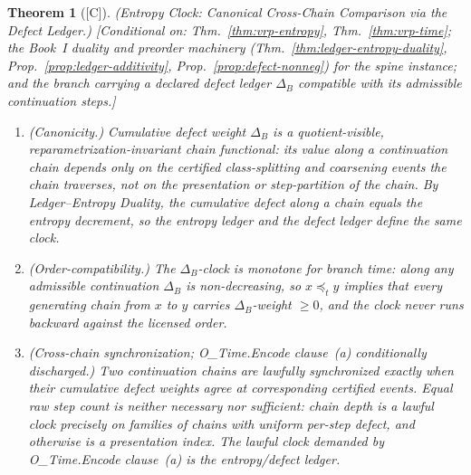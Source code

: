 \documentclass[12pt,oneside]{amsbook}
\theoremstyle{plain}
\newtheorem{theorem}{Theorem}[section]
\theoremstyle{definition}
\theoremstyle{remark}
\newcommand{\status}[1]{\textup{[#1]}}
\begin{document}
\begin{theorem}[\status{C}]\label{thm:vrp-entropy-clock}
\textup{(Entropy Clock: Canonical Cross-Chain Comparison via the
Defect Ledger.)}
\textup{[Conditional on: Thm.~\ref{thm:vrp-entropy},
Thm.~\ref{thm:vrp-time}; the Book~I duality and preorder
machinery (Thm.~\ref{thm:ledger-entropy-duality},
Prop.~\ref{prop:ledger-additivity}, Prop.~\ref{prop:defect-nonneg})
for the spine instance; and the branch carrying a declared defect
ledger $\Delta_B$ compatible with its admissible continuation
steps.]}
\begin{enumerate}[label=\textup{(\arabic*)}]
  \item \emph{(Canonicity.)}  Cumulative defect weight $\Delta_B$
    is a quotient-visible, reparametrization-invariant chain
    functional: its value along a continuation chain depends only
    on the certified class-splitting and coarsening events the
    chain traverses, not on the presentation or step-partition of
    the chain.  By Ledger--Entropy Duality, the cumulative defect
    along a chain equals the entropy decrement, so the entropy
    ledger and the defect ledger define the \emph{same} clock.
  \item \emph{(Order-compatibility.)}  The $\Delta_B$-clock is
    monotone for branch time: along any admissible continuation
    $\Delta_B$ is non-decreasing, so $x \preceq_t y$ implies that
    every generating chain from $x$ to $y$ carries
    $\Delta_B$-weight $\ge 0$, and the clock never runs backward
    against the licensed order.
  \item \emph{(Cross-chain synchronization; O\_Time.Encode
    clause~(a) conditionally discharged.)}  Two continuation
    chains are lawfully synchronized exactly when their cumulative
    defect weights agree at corresponding certified events.  Equal
    raw step count is neither necessary nor sufficient: chain
    depth is a lawful clock precisely on families of chains with
    uniform per-step defect, and otherwise is a presentation
    index.  The lawful clock demanded by O\_Time.Encode
    clause~(a) is the entropy/defect ledger.
\end{enumerate}
\end{theorem}
\end{document}
